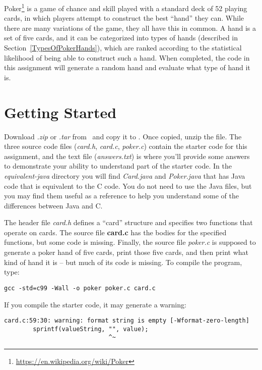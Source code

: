Poker\footnote{\url{https://en.wikipedia.org/wiki/Poker}} is a game of chance
and skill played with a standard deck of 52 playing cards, in which players
attempt to construct the best ``hand'' they can. While there are many
variations of the game, they all have this in common. A hand is a set of five
cards, and it can be categorized into types of hands (described in
Section~\ref{TypesOfPokerHands}), which are ranked according to the statistical
likelihood of being able to construct such a hand. When completed, the code in
this assignment will generate a random hand and evaluate what type of hand it
is.

\softwareengineeringfrontmatter

\section{Getting Started}

Download \textit{\shortlabname.zip} or \textit{\shortlabname.tar} from
\filesource\ and copy it to \runtimeenvironment. Once copied, unzip the file.
The three source code files (\textit{card.h}, \textit{card.c},
\textit{poker.c}) contain the starter code for this assignment, and the text
file (\textit{answers.txt}) is where you'll provide some answers to demonstrate
your ability to understand part of the starter code. In the
\mbox{\textit{equivalent-java}} directory you will find \textit{Card.java} and
\textit{Poker.java} that has Java code that is equivalent to the C code. You do
not need to use the Java files, but you may find them useful as a reference to
help you understand some of the differences between Java and C.

The header file \textit{card.h} defines a ``card'' structure and specifies two
functions that operate on cards. The source file \textbf{card.c} has the bodies
for the specified functions, but some code is missing. Finally, the source file
\textit{poker.c} is supposed to generate a poker hand of five cards, print
those five cards, and then print what kind of hand it is -- but much of its
code is missing. To compile the program, type:

\texttt{gcc -std=c99 -Wall -o poker poker.c card.c}

If you compile the starter code, it may generate a warning:

\begin{verbatim}
card.c:59:30: warning: format string is empty [-Wformat-zero-length]
        sprintf(valueString, "", value);
                             ^~
\end{verbatim}

